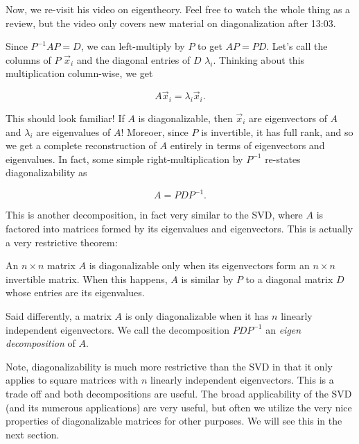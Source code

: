 \documentclass{ximera}
\begin{document}
Now, we re-visit his video on eigentheory. Feel free to watch the whole thing as a review, but the video only covers new material on diagonalization after 13:03.

\begin{center}
\end{center}

\begin{exploration}

    Since $P^{-1}AP=D$, we can left-multiply by $P$ to get $AP=PD$. Let's call the columns of $P$ $\vec{x}_i$ and the diagonal entries of $D$ $\lambda_i$. Thinking about this multiplication column-wise, we get

    $$A\vec{x}_i=\lambda_i\vec{x}_i.$$

    This should look familiar! If $A$ is diagonalizable, then $\vec{x}_i$ are eigenvectors of $A$ and $\lambda_i$ are eigenvalues of $A$! Moreoer, since $P$ is invertible, it has full rank, and so we get a complete reconstruction of $A$ entirely in terms of eigenvectors and eigenvalues. In fact, some simple right-multiplication by $P^{-1}$ re-states diagonalizability as

    $$A=PDP^{-1}.$$


\end{exploration}

This is another decomposition, in fact very similar to the SVD, where $A$ is factored into matrices formed by its eigenvalues and eigenvectors. This is actually a very restrictive theorem:

\begin{theorem}

  An $n\times n$ matrix $A$ is diagonalizable only when its eigenvectors form an $n\times n$ invertible matrix. When this happens, $A$ is similar by $P$ to a diagonal matrix $D$ whose entries are its eigenvalues.

  Said differently, a matrix $A$ is only diagonalizable when it has $n$ linearly independent eigenvectors. We call the decomposition $PDP^{-1}$ an \emph{eigen decomposition} of $A$.

\end{theorem}

Note, diagonalizability is much more restrictive than the SVD in that it only applies to square matrices with $n$ linearly independent eigenvectors. This is a trade off and both decompositions are useful. The broad applicability of the SVD (and its numerous applications) are very useful, but often we utilize the very nice properties of diagonalizable matrices for other purposes. We will see this in the next section. 
\end{document}
